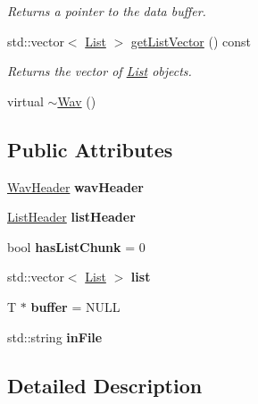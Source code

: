 \begin{DoxyCompactItemize}
\begin{DoxyCompactList}\small\item\em Returns a pointer to the data buffer. \end{DoxyCompactList}\item 
\mbox{\label{classWav_ad974c0f10e70e23d689d60591aa90456}} 
std\+::vector$<$ \hyperlink{structList}{List} $>$ \hyperlink{classWav_ad974c0f10e70e23d689d60591aa90456}{get\+List\+Vector} () const
\begin{DoxyCompactList}\small\item\em Returns the vector of \hyperlink{structList}{List} objects. \end{DoxyCompactList}\item 
virtual \hyperlink{classWav_a54ee39542f46929187c7a9e032250bdf}{$\sim$\+Wav} ()
\end{DoxyCompactItemize}
\subsection*{Public Attributes}
\begin{DoxyCompactItemize}
\item 
\mbox{\label{classWav_afc68f75eb85a46db0a63971974f8d5be}} 
\hyperlink{structWavHeader}{Wav\+Header} {\bfseries wav\+Header}
\item 
\mbox{\label{classWav_a89f07c2c8726afdffb8139842a9af064}} 
\hyperlink{structListHeader}{List\+Header} {\bfseries list\+Header}
\item 
\mbox{\label{classWav_addc4d0d2a45357e8f981e4979c54b91a}} 
bool {\bfseries has\+List\+Chunk} = 0
\item 
\mbox{\label{classWav_a5533801d7288f0f5aad06b032421e9c1}} 
std\+::vector$<$ \hyperlink{structList}{List} $>$ {\bfseries list}
\item 
\mbox{\label{classWav_a329a81309898a70392426f69df63ddaa}} 
T $\ast$ {\bfseries buffer} = N\+U\+LL
\item 
\mbox{\label{classWav_a75e9243abb294e0a69633b3dd8d7adbb}} 
std\+::string {\bfseries in\+File}
\end{DoxyCompactItemize}


\subsection{Detailed Description}
